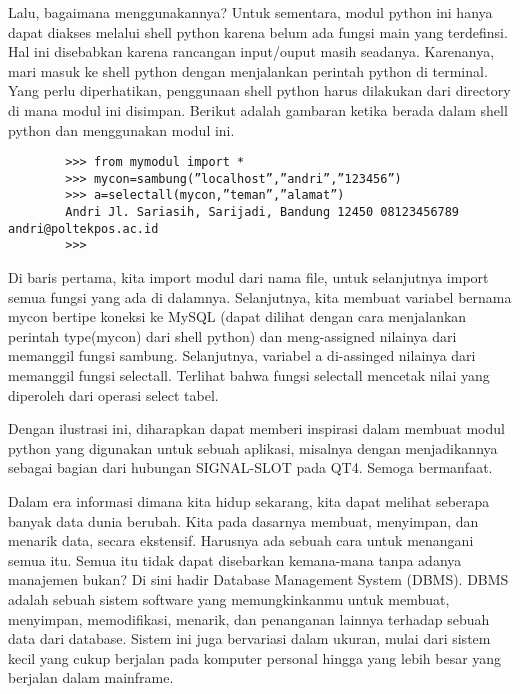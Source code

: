 Lalu, bagaimana menggunakannya? Untuk sementara, modul python ini hanya dapat diakses melalui shell python karena belum ada fungsi main yang terdefinsi. Hal ini disebabkan karena rancangan input/ouput masih seadanya. Karenanya, mari masuk ke shell python dengan menjalankan perintah python di terminal. Yang perlu diperhatikan, penggunaan shell python harus dilakukan dari directory di mana modul ini disimpan. Berikut adalah gambaran ketika berada dalam shell python dan menggunakan modul ini. 

	\begin{verbatim}
		>>> from mymodul import * 
		>>> mycon=sambung(”localhost”,”andri”,”123456”) 
		>>> a=selectall(mycon,”teman”,”alamat”) 
		Andri Jl. Sariasih, Sarijadi, Bandung 12450 08123456789 andri@poltekpos.ac.id 
		>>> 
	\end{verbatim}
	
Di baris pertama, kita import modul dari nama file, untuk selanjutnya import semua fungsi yang ada di dalamnya. Selanjutnya, kita membuat variabel bernama mycon bertipe koneksi ke MySQL (dapat dilihat dengan cara menjalankan perintah type(mycon) dari shell python) dan meng-assigned nilainya dari memanggil fungsi sambung. Selanjutnya, variabel a di-assinged nilainya dari memanggil fungsi selectall. Terlihat bahwa fungsi selectall mencetak nilai yang diperoleh dari operasi select tabel. 

Dengan ilustrasi ini, diharapkan dapat memberi inspirasi dalam membuat modul python yang digunakan untuk sebuah aplikasi, misalnya dengan menjadikannya sebagai bagian dari hubungan SIGNAL-SLOT pada QT4. Semoga bermanfaat. 

Dalam era informasi dimana kita hidup sekarang, kita dapat melihat seberapa banyak data dunia berubah. Kita pada dasarnya membuat, menyimpan, dan menarik data, secara ekstensif. Harusnya ada sebuah cara untuk menangani semua itu. Semua itu tidak dapat disebarkan kemana-mana tanpa adanya manajemen bukan? Di sini hadir Database Management System (DBMS). DBMS adalah sebuah sistem software yang memungkinkanmu untuk membuat, menyimpan, memodifikasi, menarik, dan penanganan lainnya terhadap sebuah data dari database. Sistem ini juga bervariasi dalam ukuran, mulai dari sistem kecil yang cukup berjalan pada komputer personal hingga yang lebih besar yang berjalan dalam mainframe. 

